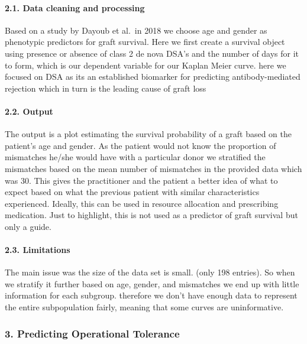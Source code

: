 \documentclass[a4paper,9pt,twocolumn,twoside,]{pinp}
\begin{document}
\hypertarget{data-cleaning-and-processing-1}{%
\paragraph{2.1. Data cleaning and
processing}\label{data-cleaning-and-processing-1}}

Based on a study by Dayoub et al.~in 2018 we choose age and gender as
phenotypic predictors for graft survival. Here we first create a
survival object using presence or absence of class 2 de nova DSA's and
the number of days for it to form, which is our dependent variable for
our Kaplan Meier curve. here we focused on DSA as its an established
biomarker for predicting antibody-mediated rejection which in turn is
the leading cause of graft loss

\hypertarget{output-1}{%
\paragraph{2.2. Output}\label{output-1}}

The output is a plot estimating the survival probability of a graft
based on the patient's age and gender. As the patient would not know the
proportion of mismatches he/she would have with a particular donor we
stratified the mismatches based on the mean number of mismatches in the
provided data which was 30. This gives the practitioner and the patient
a better idea of what to expect based on what the previous patient with
similar characteristics experienced. Ideally, this can be used in
resource allocation and prescribing medication. Just to highlight, this
is not used as a predictor of graft survival but only a guide.

\hypertarget{limitations-1}{%
\paragraph{2.3. Limitations}\label{limitations-1}}

The main issue was the size of the data set is small. (only 198
entries). So when we stratify it further based on age, gender, and
mismatches we end up with little information for each subgroup.
therefore we don't have enough data to represent the entire
subpopulation fairly, meaning that some curves are uninformative.

\hypertarget{predicting-operational-tolerance}{%
\subsubsection{3. Predicting Operational
Tolerance}\label{predicting-operational-tolerance}}
\end{document}
